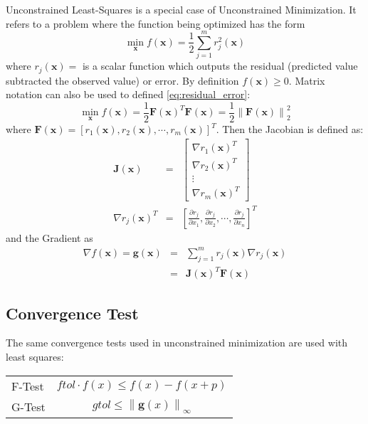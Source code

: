 \documentclass[peerreview,compsoc,onecolumn]{IEEEtran}
\newcommand{\norm}[1]{\left\lVert#1\right\rVert}
\begin{document}
Unconstrained Least-Squares is a special case of Unconstrained Minimization. It refers to a problem where the function being optimized has the form
\begin{equation}
\label{eq:residual_error}
\min\limits_{\bm{x}} f(\bm{x})=\frac{1}{2}\sum^m_{j=1} r^2_j(\bm{x})
\end{equation}
where $r_j(\bm{x}) = $ is a scalar function which outputs the residual (predicted value subtracted the observed value) or error. By definition $f(\bm{x}) \ge 0$. Matrix notation can also be used to defined \ref{eq:residual_error}:
\begin{equation}
\min\limits_{\bm{x}} f(\bm{x}) =\frac{1}{2} \bm{F}(\bm{x})^T \bm{F}(\bm{x}) = \frac{1}{2} \norm{\bm{F}(\bm{x})}^2_2
\end{equation}
where $\bm{F}(\bm{x}) = [ r_1(\bm{x}) , r_2(\bm{x}) , \cdots , r_m(\bm{x}) ]^T$. Then the Jacobian is defined as:
\begin{eqnarray}
\bm{J}(\bm{x}) &=&  \left[ \begin{array}{c}\nabla r_1(\bm{x})^T \\ \nabla r_2(\bm{x})^T \\ \vdots \\ \nabla r_m(\bm{x})^T \end{array}\right] \\
\nabla r_j(\bm{x})^T &=& \left[ \frac{\partial r_j}{\partial x_1},\frac{\partial r_j}{\partial x_2}, \cdots , \frac{\partial r_j}{\partial x_n} \right]^T
\end{eqnarray}
and the Gradient as
\begin{eqnarray}
\nabla f(\bm{x}) = \bm{g}(\bm{x}) &=& \sum^m_{j=1}r_j(\bm{x})\nabla r_j(\bm{x}) \\
&=& \bm{J}(\bm{x})^T \bm{F}(\bm{x})
\end{eqnarray}

\subsection{Convergence Test}

The same convergence tests used in unconstrained minimization are used with least squares:
\begin{center}
\begin{tabular}{lc}
F-Test & $ftol \cdot f(x)  \leq f(x) - f(x+p)$ \\
G-Test & $gtol \leq \norm{\bm{g}(x)}_\infty$ \\
\end{tabular}
\end{center}
\end{document}
